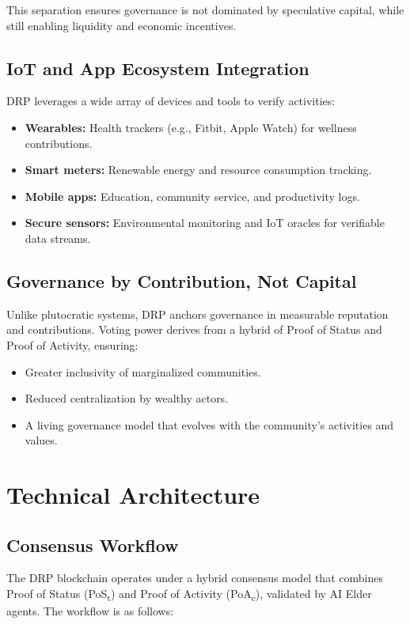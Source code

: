 \documentclass[11pt,a4paper]{article}
\begin{document}
This separation ensures governance is not dominated by speculative capital, while still enabling liquidity and economic incentives.

\subsection{IoT and App Ecosystem Integration}
DRP leverages a wide array of devices and tools to verify activities:
\begin{itemize}
    \item \textbf{Wearables:} Health trackers (e.g., Fitbit, Apple Watch) for wellness contributions.
    \item \textbf{Smart meters:} Renewable energy and resource consumption tracking.
    \item \textbf{Mobile apps:} Education, community service, and productivity logs.
    \item \textbf{Secure sensors:} Environmental monitoring and IoT oracles for verifiable data streams.
\end{itemize}

\subsection{Governance by Contribution, Not Capital}
Unlike plutocratic systems, DRP anchors governance in measurable reputation and contributions. Voting power derives from a hybrid of Proof of Status and Proof of Activity, ensuring:
\begin{itemize}
    \item Greater inclusivity of marginalized communities.
    \item Reduced centralization by wealthy actors.
    \item A living governance model that evolves with the community’s activities and values.
\end{itemize}

\section{Technical Architecture}

\subsection{Consensus Workflow}
The DRP blockchain operates under a hybrid consensus model that combines Proof of Status (PoS\textsubscript{t}) and Proof of Activity (PoA\textsubscript{c}), validated by AI Elder agents. The workflow is as follows:
\end{document}
